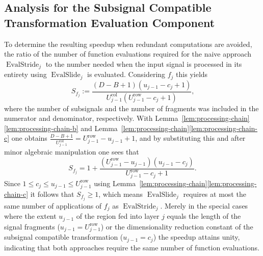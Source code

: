 \documentclass[journal]{IEEEtran}
\DeclareMathOperator{\EvalStride}{EvalStride}
\DeclareMathOperator{\EvalSlide}{EvalSlide}
\newcommand{\row}{\operatorname{row}}
\newcommand{\col}{\operatorname{col}}
\begin{document}
\subsection{Analysis for the Subsignal Compatible Transformation Evaluation Component}
To determine the resulting speedup when redundant computations are avoided, the ratio of the number of function evaluations required for the naive approach $\EvalStride_j$ to the number needed when the input signal is processed in its entirety using $\EvalSlide_j$ is evaluated.
Considering $f_j$ this yields
\begin{displaymath}
  S_{f_j} := \frac{(D - B + 1) (u_{j - 1} - c_j + 1)}{U_{j - 1}^{\col} (U_{j - 1}^{\row} - c_j + 1)}\text{,}
\end{displaymath}
where the number of subsignals and the number of fragments was included in the numerator and denominator, respectively.
With Lemma~\ref{lem:processing-chain}\ref{lem:processing-chain-b} and Lemma~\ref{lem:processing-chain}\ref{lem:processing-chain-c} one obtains
$\frac{D - B + 1}{U_{j - 1}^{\col}} = U_{j - 1}^{\row} - u_{j - 1} + 1$,
and by substituting this and after minor algebraic manipulation one sees that
\begin{displaymath}
  S_{f_j} = 1 + \frac{(U_{j - 1}^{\row} - u_{j - 1}) (u_{j - 1} - c_j)}{U_{j - 1}^{\row} - c_j + 1}\text{.}
\end{displaymath}
Since $1\leq c_j\leq u_{j - 1}\leq U_{j - 1}^{\row}$ using Lemma~\ref{lem:processing-chain}\ref{lem:processing-chain-c} it follows that $S_{f_j} \geq 1$, which means $\EvalSlide_j$ requires at most the same number of applications of $f_j$ as $\EvalStride_j$.
Merely in the special cases where the extent $u_{j - 1}$ of the region fed into layer $j$ equals the length of the signal fragments ($u_{j - 1} = U_{j - 1}^{\row}$) or the dimensionality reduction constant of the subsignal compatible transformation ($u_{j - 1} = c_j$) the speedup attains unity, indicating that both approaches require the same number of function evaluations.
\end{document}
